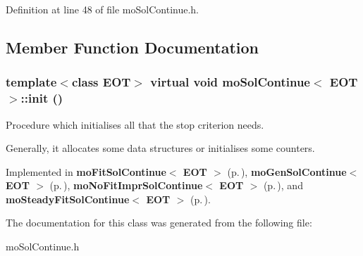 Definition at line 48 of file mo\-Sol\-Continue.h.

\subsection{Member Function Documentation}
\subsubsection{\setlength{\rightskip}{0pt plus 5cm}template$<$class EOT$>$ virtual void {\bf mo\-Sol\-Continue}$<$ EOT $>$::init ()\hspace{0.3cm}{\tt  [pure virtual]}}\label{classmo_sol_continue_a0}


Procedure which initialises all that the stop criterion needs. 

Generally, it allocates some data structures or initialises some counters. 

Implemented in {\bf mo\-Fit\-Sol\-Continue$<$ EOT $>$} {\rm (p.\,\pageref{classmo_fit_sol_continue_a2})}, {\bf mo\-Gen\-Sol\-Continue$<$ EOT $>$} {\rm (p.\,\pageref{classmo_gen_sol_continue_a2})}, {\bf mo\-No\-Fit\-Impr\-Sol\-Continue$<$ EOT $>$} {\rm (p.\,\pageref{classmo_no_fit_impr_sol_continue_a2})}, and {\bf mo\-Steady\-Fit\-Sol\-Continue$<$ EOT $>$} {\rm (p.\,\pageref{classmo_steady_fit_sol_continue_a2})}.

The documentation for this class was generated from the following file:\begin{CompactItemize}
\item 
mo\-Sol\-Continue.h\end{CompactItemize}

